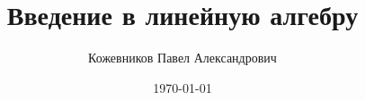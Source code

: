 \documentclass[12pt, a4paper]{book}%
\begin{document}
\title{Введение в линейную алгебру}
\author{ Кожевников Павел Александрович}

\date{\today}

\maketitle



\pagestyle{plain}

\newtheorem*{sled}{Следствие}%
\newtheorem*{sled1}{Следствие 1}%
\newtheorem*{sled2}{Следствие 2}%
\newtheorem*{sled3}{Следствие 3}%
\newtheorem*{sled4}{Следствие 4}%
\newtheorem*{sled5}{Следствие 5}%
\newtheorem*{lem}{Лемма}%
\newtheorem*{lem1}{Лемма 1}%
\newtheorem*{lem2}{Лемма 2}%

\newtheorem*{zamech}{Замечание}%



\newpage



























%
%
%








%

%
%
%
%
\end{document}
